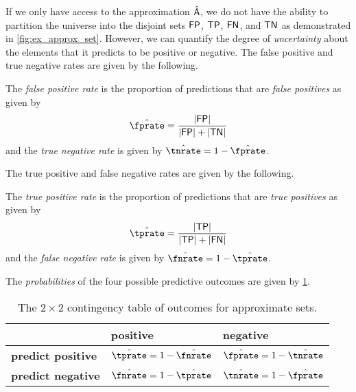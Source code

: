 \documentclass[ ../main.tex]{subfiles}
\begin{document}
If we only have access to the approximation $\hat{\Set{A}}$, we do not have the ability to partition the universe into the disjoint sets $\PlainSet{FP}$, $\PlainSet{TP}$, $\PlainSet{FN}$, and $\PlainSet{TN}$ as demonstrated in \cref{fig:ex_approx_set}.
However, we can quantify the degree of \emph{uncertainty} about the elements that it predicts to be positive or negative.
The false positive and true negative rates are given by the following.
\begin{definition}
\label{def:fprate}
The \emph{false positive rate} is the proportion of predictions that are \emph{false positives} as given by
\begin{equation}
     \hat{\fprate} = \frac{\Card{\PlainSet{FP}}}{\Card{\PlainSet{FP}} + \Card{\PlainSet{TN}}}
\end{equation}
and the \emph{true negative rate} is given by $\hat{\tnrate} = 1 - \hat{\fprate}$.
\end{definition}
The true positive and false negative rates are given by the following.
\begin{definition}
The \emph{true positive rate} is the proportion of predictions that are \emph{true positives} as given by
\begin{equation}
\hat{\tprate} = \frac{\Card{\PlainSet{TP}}}{\Card{\PlainSet{TP}} + \Card{\PlainSet{FN}}}
\end{equation}
and the \emph{false negative rate} is given by $\hat{\fnrate} = 1 - \hat{\tprate}$.
\end{definition}

The \emph{probabilities} of the four possible predictive outcomes are given by 
\cref{tbl:contingency_table}.
\begin{table}[ht]
\centering
\begin{tabular}{@{} l l l @{}}
    \toprule
    & \textbf{positive} & \textbf{negative}\\
    \midrule
    \textbf{predict positive} & $\hat{\tprate}=1-\hat{\fnrate}$ & 
    $\hat{\fprate}=1-\hat{\tnrate}$\\
    \textbf{predict negative} & $\hat{\fnrate}=1-\hat{\tprate}$ & 
    $\hat{\tnrate}=1-\hat{\fprate}$\\
    \bottomrule
\end{tabular}
\caption{The $2 \times 2$ contingency table of outcomes for approximate sets.}
\label{tbl:contingency_table}        
\end{table}
\end{document}
